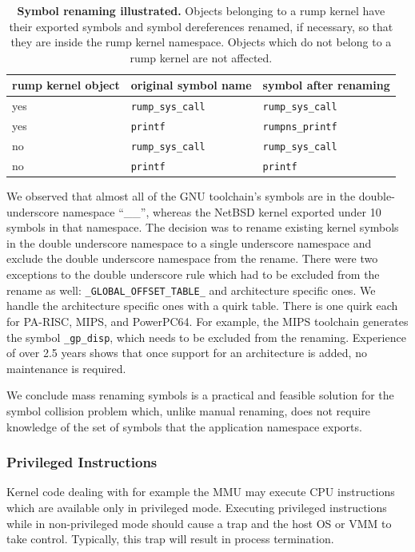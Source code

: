 \begin{table}
\begin{tabular}{|l|l|l|}
\hline
rump kernel object & original symbol name & symbol after renaming \\
\hline
\hline
yes & \verb+rump_sys_call+ & \verb+rump_sys_call+ \\
\hline
yes & \verb+printf+ & \verb+rumpns_printf+ \\
\hline
no & \verb+rump_sys_call+ & \verb+rump_sys_call+ \\
\hline
no & \verb+printf+ & \verb+printf+ \\
\hline
\end{tabular}
\caption[Symbol renaming illustrated]{\textbf{Symbol renaming
illustrated.}  Objects belonging to a rump kernel have their exported
symbols and symbol dereferences renamed, if necessary, so that they are
inside the rump kernel namespace.  Objects which do not belong to a rump
kernel are not affected.}
\label{tab:symren}
\end{table}

We observed that almost all of the GNU toolchain's symbols are in
the double-underscore namespace ``\_\_'', whereas the NetBSD kernel
exported under 10 symbols in that namespace.  The decision was to
rename existing kernel symbols in the double underscore namespace
to a single underscore namespace and exclude the double underscore
namespace from the rename.  There were two exceptions to the double
underscore rule which had to be excluded from the rename as well:
\verb+_GLOBAL_OFFSET_TABLE_+ and architecture specific ones.
We handle the architecture specific ones with a quirk table.  There
is one quirk each for PA-RISC, MIPS, and PowerPC64.  For example,
the MIPS toolchain generates the symbol \verb+_gp_disp+, which
needs to be excluded from the renaming.  Experience of over 2.5
years shows that once support for an architecture is added,
no maintenance is required.

We conclude mass renaming symbols is a practical and feasible
solution for the symbol collision problem which, unlike manual
renaming, does not require knowledge of the set of symbols that
the application namespace exports.

\subsubsection{Privileged Instructions}
\label{sect:privinst}

Kernel code dealing with for example the MMU may execute CPU
instructions which are available only in privileged mode.  Executing
privileged instructions while in non-privileged mode should cause
a trap and the host OS or VMM to take control.  Typically, this trap
will result in process termination.


